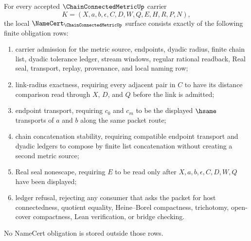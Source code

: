 \begin{theorem}
\label{thm:chain-connected-metric-namecert-obligations}
For every accepted $\ChainConnectedMetricUp$ carrier
$$
K=(X,a,b,\epsilon,C,D,W,Q,E,H,R,P,N),
$$
the local $\NameCert_{\ChainConnectedMetricUp}$ surface consists exactly of the following finite obligation rows:
\begin{enumerate}
\item carrier admission for the metric source, endpoints, dyadic radius, finite chain list, dyadic tolerance ledger, stream windows, regular rational readback, Real seal, transport, replay, provenance, and local naming row;
\item link-radius exactness, requiring every adjacent pair in $C$ to have its distance comparison read through $X$, $D$, and $Q$ before the link is admitted;
\item endpoint transport, requiring $c_0$ and $c_m$ to be the displayed $\hsame$ transports of $a$ and $b$ along the same packet route;
\item chain concatenation stability, requiring compatible endpoint transport and dyadic ledgers to compose by finite list concatenation without creating a second metric source;
\item Real seal nonescape, requiring $E$ to be read only after $X,a,b,\epsilon,C,D,W,Q$ have been displayed;
\item ledger refusal, rejecting any consumer that asks the packet for host connectedness, quotient equality, Heine--Borel compactness, trichotomy, open-cover compactness, Lean verification, or bridge checking.
\end{enumerate}
No NameCert obligation is stored outside those rows.
\end{theorem}
